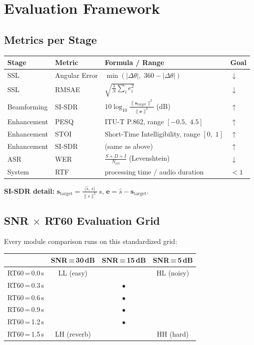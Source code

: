 \documentclass[11pt,a4paper]{article}
\begin{document}
\section{Evaluation Framework}

\subsection{Metrics per Stage}

\begin{center}
\begin{tabular}{llll}
\toprule
\textbf{Stage} & \textbf{Metric} & \textbf{Formula / Range} & \textbf{Goal}\\
\midrule
SSL & Angular Error & $\min(|\Delta\theta|,\;360\!-\!|\Delta\theta|)$ & $\downarrow$\\
SSL & RMSAE & $\sqrt{\frac{1}{N}\sum_i e_i^2}$ & $\downarrow$\\[3pt]
Beamforming & SI-SDR & $10\log_{10}\!\frac{\|\mathbf{s}_{\text{target}}\|^2}{\|\mathbf{e}\|^2}$ \;(dB) & $\uparrow$\\[3pt]
Enhancement & PESQ & ITU-T P.862, range $[-0.5,\;4.5]$ & $\uparrow$\\
Enhancement & STOI & Short-Time Intelligibility, range $[0,\;1]$ & $\uparrow$\\
Enhancement & SI-SDR & (same as above) & $\uparrow$\\[3pt]
ASR & WER & $\frac{S+D+I}{N_{\text{ref}}}$ \;(Levenshtein) & $\downarrow$\\[3pt]
System & RTF & processing time / audio duration & $<\!1$\\
\bottomrule
\end{tabular}
\end{center}

\noindent\textbf{SI-SDR detail:}\quad
$\mathbf{s}_{\text{target}} = \frac{\langle\hat{s},\,s\rangle}{\|s\|^2}\,s$,\quad
$\mathbf{e} = \hat{s} - \mathbf{s}_{\text{target}}$.

\subsection{SNR $\times$ RT60 Evaluation Grid}

Every module comparison runs on this standardized grid:

\begin{center}
\begin{tabular}{lccc}
\toprule
& \textbf{SNR\,=\,30\,dB} & \textbf{SNR\,=\,15\,dB} & \textbf{SNR\,=\,5\,dB}\\
\midrule
RT60\,=\,0.0\,s & LL (easy) & & HL (noisy)\\
RT60\,=\,0.3\,s & & $\bullet$ &\\
RT60\,=\,0.6\,s & & $\bullet$ &\\
RT60\,=\,0.9\,s & & $\bullet$ &\\
RT60\,=\,1.2\,s & & $\bullet$ &\\
RT60\,=\,1.5\,s & LH (reverb) & & HH (hard)\\
\bottomrule
\end{tabular}
\end{center}
\end{document}
